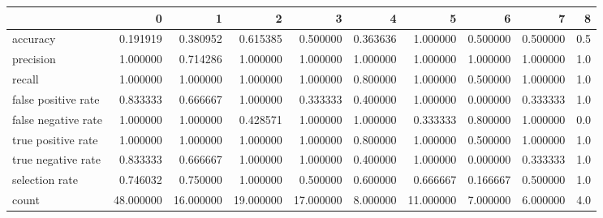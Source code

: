 \begin{tabular}{lrrrrrrrrr}
\toprule
{} &          0 &          1 &          2 &          3 &         4 &          5 &         6 &         7 &    8 \\
\midrule
accuracy            &   0.191919 &   0.380952 &   0.615385 &   0.500000 &  0.363636 &   1.000000 &  0.500000 &  0.500000 &  0.5 \\
precision           &   1.000000 &   0.714286 &   1.000000 &   1.000000 &  1.000000 &   1.000000 &  1.000000 &  1.000000 &  1.0 \\
recall              &   1.000000 &   1.000000 &   1.000000 &   1.000000 &  0.800000 &   1.000000 &  0.500000 &  1.000000 &  1.0 \\
false positive rate &   0.833333 &   0.666667 &   1.000000 &   0.333333 &  0.400000 &   1.000000 &  0.000000 &  0.333333 &  1.0 \\
false negative rate &   1.000000 &   1.000000 &   0.428571 &   1.000000 &  1.000000 &   0.333333 &  0.800000 &  1.000000 &  0.0 \\
true positive rate  &   1.000000 &   1.000000 &   1.000000 &   1.000000 &  0.800000 &   1.000000 &  0.500000 &  1.000000 &  1.0 \\
true negative rate  &   0.833333 &   0.666667 &   1.000000 &   1.000000 &  0.400000 &   1.000000 &  0.000000 &  0.333333 &  1.0 \\
selection rate      &   0.746032 &   0.750000 &   1.000000 &   0.500000 &  0.600000 &   0.666667 &  0.166667 &  0.500000 &  1.0 \\
count               &  48.000000 &  16.000000 &  19.000000 &  17.000000 &  8.000000 &  11.000000 &  7.000000 &  6.000000 &  4.0 \\
\bottomrule
\end{tabular}
